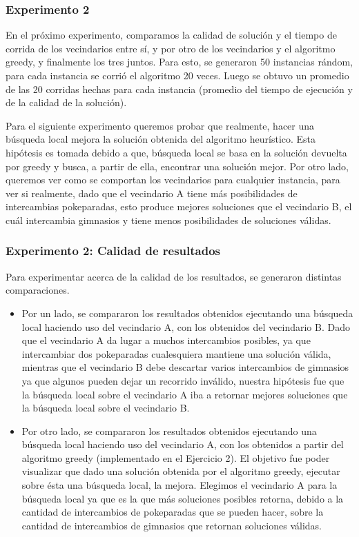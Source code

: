         \subsubsection{Experimento 2}

        En el próximo experimento, comparamos la calidad de solución y el tiempo de corrida de los vecindarios entre sí, y por otro de los vecindarios y el algoritmo greedy, y finalmente los tres juntos. Para esto, se generaron 50 instancias rándom, para cada instancia se corrió el algoritmo 20 veces. Luego se obtuvo un promedio de las 20 corridas hechas para cada instancia (promedio del tiempo de ejecución y de la calidad de la solución).

        \par Para el siguiente experimento queremos probar que realmente, hacer una búsqueda local mejora la solución obtenida del algoritmo heurístico. Esta hipótesis es tomada debido a que, búsqueda local se basa en la solución devuelta por greedy y busca, a partir de ella, encontrar una solución mejor. Por otro lado, queremos ver como se comportan los vecindarios para cualquier instancia, para ver si realmente, dado que el vecindario A tiene más posibilidades de intercambias pokeparadas, esto produce mejores soluciones que el vecindario B, el cuál intercambia gimnasios y tiene menos posibilidades de soluciones válidas.

        \subsubsection{Experimento 2: Calidad de resultados} 

            Para experimentar acerca de la calidad de los resultados, se generaron distintas comparaciones. 

            \begin{itemize}
                \item Por un lado, se compararon los resultados obtenidos ejecutando una búsqueda local haciendo uso del vecindario A, con los obtenidos del vecindario B.
                Dado que el vecindario A da lugar a muchos intercambios posibles, ya que intercambiar dos pokeparadas cualesquiera mantiene una solución válida, mientras que el vecindario B debe descartar varios intercambios de gimnasios ya que algunos pueden dejar un recorrido inválido, nuestra hipótesis fue que la búsqueda local sobre el vecindario A iba a retornar mejores soluciones que la búsqueda local sobre el vecindario B.
 
                \item Por otro lado, se compararon los resultados obtenidos ejecutando una búsqueda local haciendo uso del vecindario A, con los obtenidos a partir del algoritmo greedy (implementado en el Ejercicio 2).
                El objetivo fue poder visualizar que dado una solución obtenida por el algoritmo greedy, ejecutar sobre ésta una búsqueda local, la mejora.
                Elegimos el vecindario A para la búsqueda local ya que es la que más soluciones posibles retorna, debido a la cantidad de intercambios de pokeparadas que se pueden hacer, sobre la cantidad de intercambios de gimnasios que retornan soluciones válidas.
            \end{itemize}


